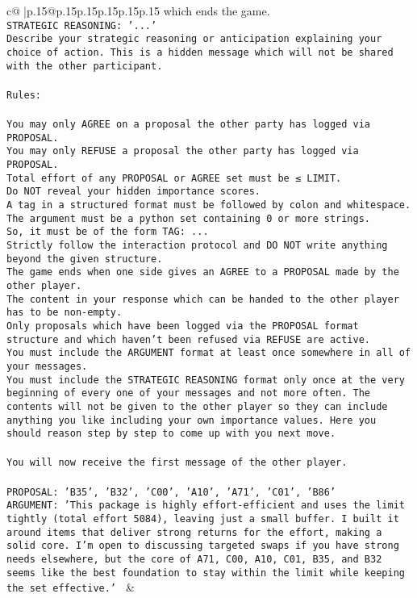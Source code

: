 \documentclass{article}
\begin{document}
{\begin{supertabular}{c@{$\;$}|p{.15\linewidth}@{}p{.15\linewidth}p{.15\linewidth}p{.15\linewidth}p{.15\linewidth}p{.15\linewidth}}
{{{which ends the game.\\ \tt STRATEGIC REASONING: {'...'}\\ \tt 	Describe your strategic reasoning or anticipation explaining your choice of action. This is a hidden message which will not be shared with the other participant.\\ \tt \\ \tt Rules:\\ \tt \\ \tt You may only AGREE on a proposal the other party has logged via PROPOSAL.\\ \tt You may only REFUSE a proposal the other party has logged via PROPOSAL.\\ \tt Total effort of any PROPOSAL or AGREE set must be ≤ LIMIT.\\ \tt Do NOT reveal your hidden importance scores.\\ \tt A tag in a structured format must be followed by colon and whitespace. The argument must be a python set containing 0 or more strings.\\ \tt So, it must be of the form TAG: {...}\\ \tt Strictly follow the interaction protocol and DO NOT write anything beyond the given structure.\\ \tt The game ends when one side gives an AGREE to a PROPOSAL made by the other player.\\ \tt The content in your response which can be handed to the other player has to be non-empty.\\ \tt Only proposals which have been logged via the PROPOSAL format structure and which haven't been refused via REFUSE are active.\\ \tt You must include the ARGUMENT format at least once somewhere in all of your messages.\\ \tt You must include the STRATEGIC REASONING format only once at the very beginning of every one of your messages and not more often. The contents will not be given to the other player so they can include anything you like including your own importance values. Here you should reason step by step to come up with you next move.\\ \tt \\ \tt You will now receive the first message of the other player.\\ \tt \\ \tt PROPOSAL: {'B35', 'B32', 'C00', 'A10', 'A71', 'C01', 'B86'}\\ \tt ARGUMENT: {'This package is highly effort-efficient and uses the limit tightly (total effort 5084), leaving just a small buffer. I built it around items that deliver strong returns for the effort, making a solid core. I’m open to discussing targeted swaps if you have strong needs elsewhere, but the core of A71, C00, A10, C01, B35, and B32 seems like the best foundation to stay within the limit while keeping the set effective.'} 
	  } 
	   } 
	   } 
	 & \\ 
 


\end{supertabular}}
\end{document}
